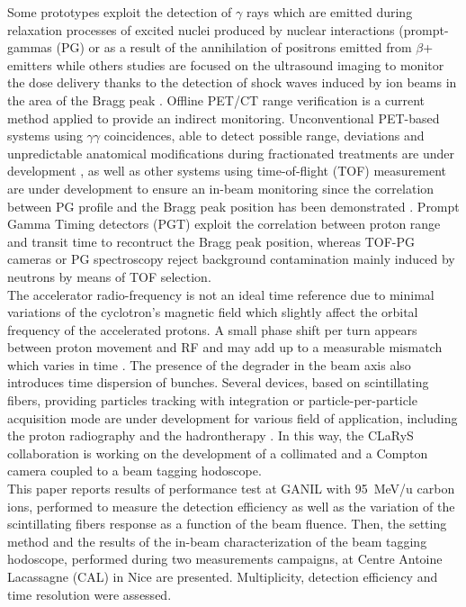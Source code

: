\documentclass[a4paper,11pt]{article}
\begin{document}
Some prototypes exploit the detection of $\gamma$ rays which are emitted during  relaxation  processes of excited nuclei produced by nuclear interactions (prompt-gammas (PG) or as a result of the annihilation of positrons emitted from $\beta$+ emitters while others studies are focused on the ultrasound imaging to monitor the dose delivery thanks to the detection of shock waves induced by ion beams in the area of the Bragg peak \cite{Hickling2018}. Offline PET/CT range verification is a current method applied to provide an indirect monitoring. Unconventional PET-based systems using $\gamma\gamma$ coincidences, able to detect possible range, deviations and unpredictable anatomical modifications during fractionated treatments are under development \cite{Crespo2005, Parodi2015}, as well as other systems using time-of-flight (TOF) measurement are under development to ensure an in-beam monitoring since the correlation between PG profile and the Bragg peak position has been demonstrated \cite{Testa2008}. Prompt Gamma Timing detectors (PGT) exploit the correlation between proton range and transit time to recontruct the Bragg peak position\cite{Marcatili2020}, whereas TOF-PG cameras or PG spectroscopy reject background contamination mainly induced by neutrons  by means of TOF selection. \\

The accelerator radio-frequency is not an ideal time reference due to minimal variations of the cyclotron’s magnetic field which slightly affect the orbital frequency of the accelerated protons. A small phase shift per turn appears between proton movement and RF and may add up to a measurable mismatch which varies in time \cite{Werner2019}. The presence of the degrader in the beam axis also introduces time dispersion of bunches. Several devices, based on scintillating fibers, providing particles tracking with integration \cite{Leverington2018} or particle-per-particle \cite{Horikawa2004, Achenbach2008, Braccini2012} acquisition mode are under development for various field of application, including the proton radiography \cite{Presti2013} and the hadrontherapy \cite{PAPA2016}. 
In this way, the CLaRyS collaboration is working on the development of a collimated and a Compton camera coupled to a beam tagging hodoscope.\\

This paper reports results of performance test at GANIL with 95~MeV/u carbon ions, performed to measure the detection efficiency as well as the variation of the scintillating fibers response as a function of the beam fluence. Then, the setting method and the results of the in-beam characterization of the beam tagging hodoscope, performed during two measurements campaigns, at Centre Antoine Lacassagne (CAL) in Nice are presented. Multiplicity, detection efficiency and time resolution were assessed.
\end{document}
